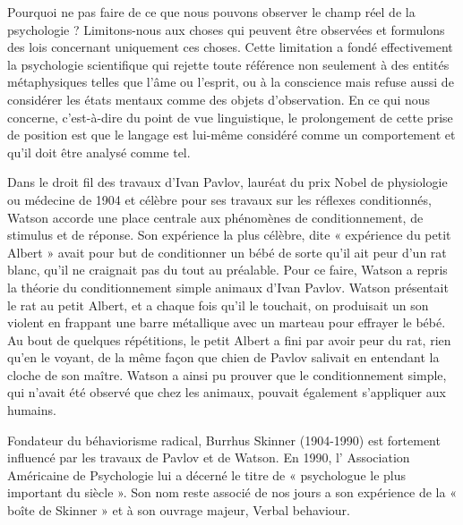 Pourquoi ne pas faire de ce que nous pouvons observer le champ réel de la psychologie ? Limitons-nous aux choses qui peuvent être observées et formulons des lois concernant uniquement ces choses. Cette limitation a fondé effectivement la psychologie scientifique qui rejette toute référence non seulement à des entités métaphysiques telles que l’âme ou l’esprit, ou à la conscience mais refuse aussi de considérer les états mentaux comme des objets d’observation. En ce qui nous concerne, c’est-à-dire du point de vue linguistique, le prolongement de cette prise de position est que le langage est lui-même considéré comme un comportement et qu’il doit être analysé comme tel.\par


Dans le droit fil des travaux d’Ivan Pavlov, lauréat du prix Nobel de physiologie ou médecine de 1904 et célèbre pour ses travaux sur les réflexes conditionnés, Watson accorde une place centrale aux phénomènes de conditionnement, de stimulus et de réponse. Son expérience la plus célèbre, dite « expérience du petit Albert » avait pour but de conditionner un bébé de sorte qu’il ait peur d’un rat blanc, qu’il ne craignait pas du tout au préalable. Pour ce faire, Watson a repris la théorie du conditionnement simple animaux d’Ivan Pavlov. Watson présentait le rat au petit Albert, et a chaque fois qu’il le touchait, on produisait un son violent en frappant une barre métallique avec un marteau pour effrayer le bébé. Au bout de quelques répétitions, le petit Albert a fini par avoir peur du rat, rien qu’en le voyant, de la même façon que chien de Pavlov salivait en entendant la cloche de son maître. Watson a ainsi pu prouver que le conditionnement simple, qui n’avait été observé que chez les animaux, pouvait également s’appliquer aux humains.\par

Fondateur du béhaviorisme radical, Burrhus Skinner (1904-1990) est fortement influencé par les travaux de Pavlov et de Watson. En 1990, l’ Association Américaine de Psychologie lui a décerné le titre de « psychologue le plus important du siècle ». Son nom reste associé de nos jours a son expérience de la « boîte de Skinner » et à son ouvrage majeur, Verbal behaviour.\par



